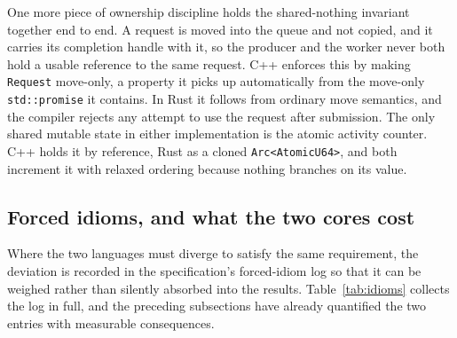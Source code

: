 \documentclass[english,oneside,a4paper,censored,csm,software-track-2020]{HYthesisML}
\begin{document}
One more piece of ownership discipline holds the shared-nothing invariant together end to end. A
request is moved into the queue and not copied, and it carries its completion handle with it, so
the producer and the worker never both hold a usable reference to the same request. C++ enforces
this by making \texttt{Request} move-only, a property it picks up automatically from the
move-only \texttt{std::promise} it contains. In Rust it follows from ordinary move semantics, and
the compiler rejects any attempt to use the request after submission. The only shared mutable
state in either implementation is the atomic activity counter. C++ holds it by reference, Rust as
a cloned \texttt{Arc<AtomicU64>}, and both increment it with relaxed ordering because nothing
branches on its value.

\subsection{Forced idioms, and what the two cores cost}
\label{sec:idioms}
Where the two languages must diverge to satisfy the same requirement, the deviation is
recorded in the specification's forced-idiom log so that it can be weighed rather than
silently absorbed into the results. Table~\ref{tab:idioms} collects the log in full, and the
preceding subsections have already quantified the two entries with measurable consequences.
\end{document}
